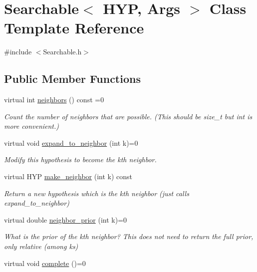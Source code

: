 \hypertarget{class_searchable}{}\section{Searchable$<$ H\+YP, Args $>$ Class Template Reference}
\label{class_searchable}


{\ttfamily \#include $<$Searchable.\+h$>$}

\subsection*{Public Member Functions}
\begin{DoxyCompactItemize}
\item 
virtual int \hyperlink{class_searchable_aec30063fcc9bed5d005f8318efa8492d}{neighbors} () const =0
\begin{DoxyCompactList}\small\item\em Count the number of neighbors that are possible. (This should be size\+\_\+t but int is more convenient.) \end{DoxyCompactList}\item 
virtual void \hyperlink{class_searchable_a1786307b9f2dadc8c66c94adef220270}{expand\+\_\+to\+\_\+neighbor} (int k)=0
\begin{DoxyCompactList}\small\item\em Modify this hypothesis to become the k\textquotesingle{}th neighbor. \end{DoxyCompactList}\item 
virtual H\+YP \hyperlink{class_searchable_acd4cf198859084f7a656ef507e65a872}{make\+\_\+neighbor} (int k) const
\begin{DoxyCompactList}\small\item\em Return a new hypothesis which is the k\textquotesingle{}th neighbor (just calls expand\+\_\+to\+\_\+neighbor) \end{DoxyCompactList}\item 
virtual double \hyperlink{class_searchable_abebbaaf94b0502a35d0ba686af73bd08}{neighbor\+\_\+prior} (int k)=0
\begin{DoxyCompactList}\small\item\em What is the prior of the k\textquotesingle{}th neighbor? This does not need to return the full prior, only relative (among ks) \end{DoxyCompactList}\item 
virtual void \hyperlink{class_searchable_a3ae6263b49a0f9da94f5dcc23af6618e}{complete} ()=0

\end{DoxyCompactItemize}
